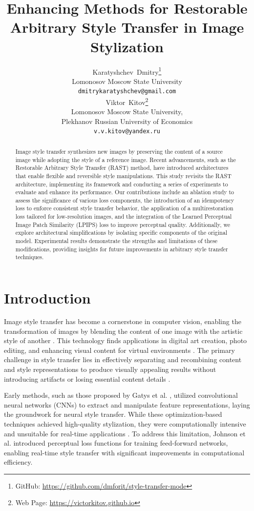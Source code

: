\documentclass{article}
\title{Enhancing Methods for Restorable Arbitrary Style Transfer in Image Stylization}
\author{
    Karatyshchev~Dmitry\thanks{GitHub: \url{https://github.com/dmforit/style-transfer-mode}} \\
    Lomonosov Moscow State University\\
    \texttt{dmitrykaratyshchev@gmail.com} \\
    \And
    Viktor~Kitov\thanks{Web Page: \url{https://victorkitov.github.io}} \\
    Lomonosov Moscow State University,\\
    Plekhanov Russian University of Economics\\
    \texttt{v.v.kitov@yandex.ru} \\
}
\date{}
\begin{document}
\maketitle

\begin{abstract}
Image style transfer synthesizes new images by preserving the content of a source image while adopting the style of a reference image. Recent advancements, such as the Restorable Arbitrary Style Transfer (RAST) method, have introduced architectures that enable flexible and reversible style manipulations. This study revisits the RAST architecture, implementing its framework and conducting a series of experiments to evaluate and enhance its performance. Our contributions include an ablation study to assess the significance of various loss components, the introduction of an idempotency loss to enforce consistent style transfer behavior, the application of a multirestoration loss tailored for low-resolution images, and the integration of the Learned Perceptual Image Patch Similarity (LPIPS) loss to improve perceptual quality. Additionally, we explore architectural simplifications by isolating specific components of the original model. Experimental results demonstrate the strengths and limitations of these modifications, providing insights for future improvements in arbitrary style transfer techniques.
\end{abstract}


\section{Introduction}
\label{sec:introduction}

Image style transfer has become a cornerstone in computer vision, enabling the transformation of images by blending the content of one image with the artistic style of another \cite{Gatys2016}. This technology finds applications in digital art creation, photo editing, and enhancing visual content for virtual environments \cite{Johnson2016, Huang2017}. The primary challenge in style transfer lies in effectively separating and recombining content and style representations to produce visually appealing results without introducing artifacts or losing essential content details \cite{Li2017, Johnson2016}.

Early methods, such as those proposed by Gatys et al. \cite{Gatys2016}, utilized convolutional neural networks (CNNs) to extract and manipulate feature representations, laying the groundwork for neural style transfer. While these optimization-based techniques achieved high-quality stylization, they were computationally intensive and unsuitable for real-time applications \cite{Gatys2016}. To address this limitation, Johnson et al. \cite{Johnson2016} introduced perceptual loss functions for training feed-forward networks, enabling real-time style transfer with significant improvements in computational efficiency.
\end{document}
